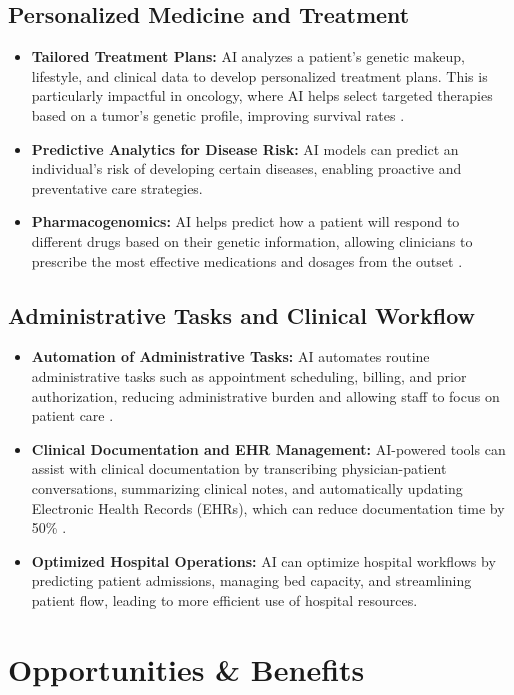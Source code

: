 \subsection{Personalized Medicine and Treatment}
\begin{itemize}
    \item \textbf{Tailored Treatment Plans:} AI analyzes a patient's genetic makeup, lifestyle, and clinical data to develop personalized treatment plans. This is particularly impactful in oncology, where AI helps select targeted therapies based on a tumor's genetic profile, improving survival rates \cite{NRINA_PersonalizedMedicine}.
    \item \textbf{Predictive Analytics for Disease Risk:} AI models can predict an individual's risk of developing certain diseases, enabling proactive and preventative care strategies.
    \item \textbf{Pharmacogenomics:} AI helps predict how a patient will respond to different drugs based on their genetic information, allowing clinicians to prescribe the most effective medications and dosages from the outset \cite{NIH_PersonalizedMedicine}.
\end{itemize}

\subsection{Administrative Tasks and Clinical Workflow}
\begin{itemize}
    \item \textbf{Automation of Administrative Tasks:} AI automates routine administrative tasks such as appointment scheduling, billing, and prior authorization, reducing administrative burden and allowing staff to focus on patient care \cite{Keragon_AdminTasks}.
    \item \textbf{Clinical Documentation and EHR Management:} AI-powered tools can assist with clinical documentation by transcribing physician-patient conversations, summarizing clinical notes, and automatically updating Electronic Health Records (EHRs), which can reduce documentation time by 50\% \cite{Softude_AdminTasks, Keragon_AIBenefits}.
    \item \textbf{Optimized Hospital Operations:} AI can optimize hospital workflows by predicting patient admissions, managing bed capacity, and streamlining patient flow, leading to more efficient use of hospital resources.
\end{itemize}

\section{Opportunities \& Benefits}


